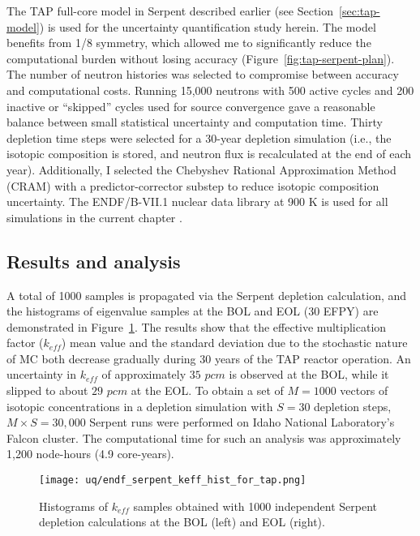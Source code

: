 The \gls{TAP} full-core model in Serpent described earlier (see  
Section~\ref{sec:tap-model}) is used for the uncertainty quantification study 
herein. The model benefits from 1/8 symmetry, which allowed me to 
significantly reduce the computational burden without losing accuracy
(Figure~\ref{fig:tap-serpent-plan}). The number of neutron histories was 
selected to compromise between accuracy and computational costs. Running 
15,000 neutrons with 500 active cycles and 200 inactive or “skipped” cycles 
used for source convergence gave a reasonable balance between small 
statistical uncertainty and computation time. Thirty depletion time steps were 
selected for a 30-year depletion simulation (i.e., the isotopic composition is 
stored, and neutron flux is recalculated at the end of each year). 
Additionally, I selected the Chebyshev Rational Approximation Method (CRAM) 
with a predictor-corrector substep \cite{pusa_computing_2010} to reduce 
isotopic 
composition uncertainty. The ENDF/B-VII.1 nuclear data library at 900 K is 
used for all simulations in the current chapter 
\cite{chadwick_endf/b-vii.1_2011}.

\subsection{Results and analysis}
A total of 1000 samples is propagated via the Serpent depletion calculation,  
and the histograms of eigenvalue samples at the \gls{BOL} and \gls{EOL} (30 
\gls{EFPY}) are demonstrated in Figure~\ref{fig:uq-serp-keff-hist}. The 
results show that the effective multiplication factor ($k_{eff}$) mean value 
and the standard deviation due to the stochastic nature of \gls{MC}
both decrease gradually during 30 years of the \gls{TAP} reactor operation. 
An uncertainty in $k_{eff}$ of approximately $35$ $pcm$ is observed at the 
\gls{BOL}, while it slipped to about $29$ $pcm$ at the \gls{EOL}. To obtain 
a set of $M=1000$ vectors of isotopic concentrations in a depletion 
simulation with $S=30$ depletion steps, $M\times S=30,\!000$ Serpent runs were 
performed on Idaho National Laboratory's Falcon cluster. The computational 
time for such an analysis was approximately 1,200 node-hours (4.9 core-years).
\begin{figure}[htp!] %
	\centering
	\texttt{[image: uq/endf\_serpent\_keff\_hist\_for\_tap.png]}
		\vspace{-4mm}
	\caption{Histograms of $k_{eff}$ samples obtained with 1000 independent 
	Serpent depletion calculations at the \gls{BOL} (left) and \gls{EOL} 
	(right).}
	\label{fig:uq-serp-keff-hist}
\end{figure}

